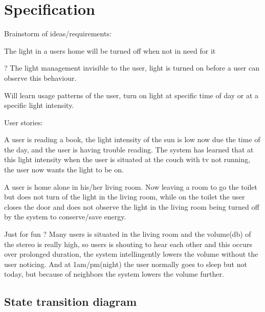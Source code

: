\chapter{Specification}

Brainstorm of ideas/requirements:

The light in a users home will be turned off when not in need for it

? The light management invisible to the user, light is turned on before a user can observe this behaviour.

Will learn usage patterns of the user, turn on light at specific time of day or at a specific light intensity.

User stories:

A user is reading a book, the light intensity of the sun is low now due the time of the day, and the user is having trouble reading. The system has learned that at this light intensity when the user is situated at the couch with tv not running, the user now wants the light to be on.

A user is home alone in his/her living room. Now leaving a room to go the toilet but does not turn of the light in the living room, while on the toilet the user closes the door and does not observe the light in the living room being turned off by the system to conserve/save energy.

Just for fun ? Many users is situated in the living room and the volume(db) of the stereo is really high, so users is shouting to hear each other and this occurs over prolonged duration, the system intellingently lowers the volume without the user noticing. And at 1am/pm(night) the user normally goes to sleep but not today, but because of neighbors the system lowers the volume further.

\section{State transition diagram}
